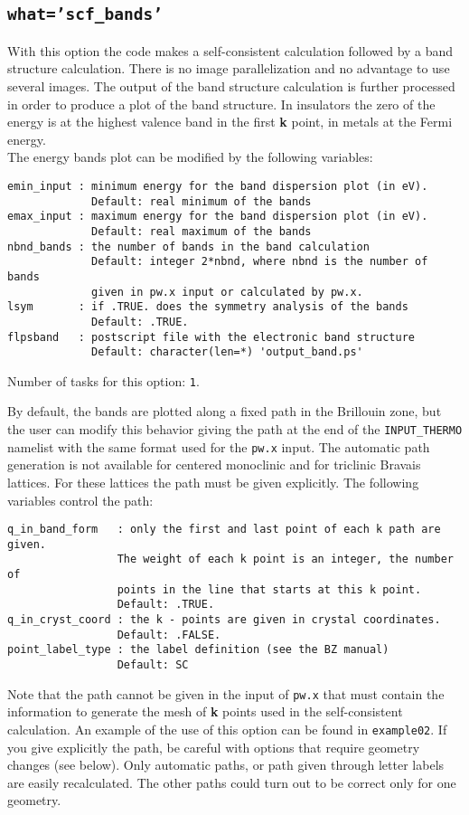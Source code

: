 \documentclass[12pt,a4paper]{article}
\begin{document}
\subsection{\color{web-blue}\texttt{what='scf\_bands'}}
With this option the code makes a self-consistent calculation followed 
by a band structure calculation. There is no image parallelization and no
advantage to use several images. The output of the band structure 
calculation is further processed in order to produce a plot of the band 
structure.
In insulators the zero of the energy is at the highest valence band 
in the first {\bf k} point, in metals at the Fermi energy. \\
The energy bands plot can be modified by the following variables:

\begin{verbatim}
emin_input : minimum energy for the band dispersion plot (in eV).
             Default: real minimum of the bands
emax_input : maximum energy for the band dispersion plot (in eV).
             Default: real maximum of the bands
nbnd_bands : the number of bands in the band calculation
             Default: integer 2*nbnd, where nbnd is the number of bands 
             given in pw.x input or calculated by pw.x.
lsym       : if .TRUE. does the symmetry analysis of the bands
             Default: .TRUE.
flpsband   : postscript file with the electronic band structure
             Default: character(len=*) 'output_band.ps'
\end{verbatim}
Number of tasks for this option: \texttt{1}.

By default, the bands are plotted along a fixed path in the Brillouin
zone, but the user can modify this behavior giving the path at the end of 
the \texttt{INPUT\_THERMO} namelist with the same format used for 
the \texttt{pw.x} input. The automatic path generation is not available 
for centered monoclinic and for triclinic Bravais lattices. For these
lattices the path must be given explicitly.
The following variables control the path:

\begin{verbatim}
q_in_band_form   : only the first and last point of each k path are given.
                 The weight of each k point is an integer, the number of 
                 points in the line that starts at this k point.
                 Default: .TRUE.
q_in_cryst_coord : the k - points are given in crystal coordinates.
                 Default: .FALSE.
point_label_type : the label definition (see the BZ manual)
                 Default: SC
\end{verbatim}
Note that the path cannot be given in the input of \texttt{pw.x} that
must contain the information to generate the mesh of {\bf k} points 
used in the self-consistent calculation. 
An example of the use of this option can be found in \texttt{example02}.
If you give explicitly the path, be careful with options that require
geometry changes (see below). Only automatic paths, or path given through 
letter labels are easily recalculated. The other paths could turn out 
to be correct only for one geometry.
\end{document}
